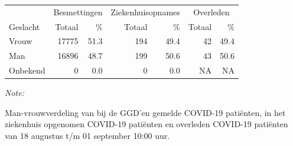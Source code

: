 \documentclass[
  english,
  man,floatsintext]{apa6}
\begin{document}
\begin{table}
\centering\begingroup\fontsize{11}{13}\selectfont

\begin{threeparttable}
\begin{tabular}{lrrrrrr}
\toprule
\multicolumn{1}{c}{ } & \multicolumn{2}{c}{Besmettingen} & \multicolumn{2}{c}{Ziekenhuisopnames} & \multicolumn{2}{c}{Overleden} \\
\cmidrule(l{3pt}r{3pt}){2-3} \cmidrule(l{3pt}r{3pt}){4-5} \cmidrule(l{3pt}r{3pt}){6-7}
Geslacht & Totaal & \% & Totaal & \% & Totaal & \%\\
\midrule
Vrouw & 17775 & 51.3 & 194 & 49.4 & 42 & 49.4\\
Man & 16896 & 48.7 & 199 & 50.6 & 43 & 50.6\\
Onbekend & 0 & 0.0 & 0 & 0.0 & NA & NA\\
\bottomrule
\end{tabular}
\begin{tablenotes}
\item \textit{Note: } 
\item Man-vrouwverdeling van bij de GGD’en gemelde COVID-19 patiënten, in het ziekenhuis opgenomen COVID-19 patiënten en overleden COVID-19 patiënten van 18 augustus t/m 01 september 10:00 uur.
\end{tablenotes}
\end{threeparttable}
\endgroup{}
\end{table}
\newpage
\end{document}
